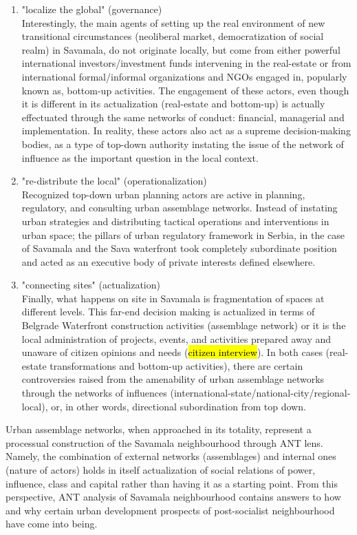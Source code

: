 \documentclass[11pt]{report}
\begin{document}
\begin{enumerate}
\item "localize the global" (governance)
\\
Interestingly, the main agents of setting up the real environment of new transitional circumstances (neoliberal market, democratization of social realm) in Savamala, do not originate locally, but come from either powerful international investors/investment funds intervening in the real-estate or from international formal/informal organizations and NGOs engaged in, popularly known as, bottom-up activities.
The engagement of these actors, even though it is different in its actualization (real-estate and bottom-up) is actually effectuated through the same networks of conduct: financial, managerial and implementation.
In reality, these actors also act as a supreme decision-making bodies, as a type of top-down authority instating the issue of the network of influence as the important question in  the local context. 

\item "re-distribute the local" (operationalization)
\\
Recognized top-down urban planning actors are active in planning, regulatory, and consulting urban assemblage networks.
Instead of instating urban strategies and distributing tactical operations and interventions in urban space; the pillars of urban regulatory framework in Serbia, in the case of Savamala and the Sava waterfront took completely subordinate position and acted as an executive body of private interests defined elsewhere.

\item "connecting sites" (actualization)
\\
Finally, what happens on site in Savamala is fragmentation of spaces at different levels.
This far-end decision making is actualized in terms of Belgrade Waterfront construction activities (assemblage network) or it is the local administration of projects, events, and activities prepared away and unaware of citizen opinions and needs (\hl{citizen interview}).
In both cases (real-estate transformations and bottom-up activities), there are certain controversies raised from the amenability of urban assemblage networks through the networks of influences (international-state/national-city/regional-local), or, in other words, directional subordination from top down.
\end{enumerate}

Urban assemblage networks, when approached in its totality, represent a processual construction of the Savamala neighbourhood through ANT lens.
Namely, the combination of external networks (assemblages) and internal ones (nature of actors) holds in itself actualization of social relations of power, influence, class and capital rather than having it as a starting point.
From this perspective, ANT analysis of Savamala neighbourhood contains answers to how and why certain urban development prospects of post-socialist neighbourhood have come into being.
\end{document}
